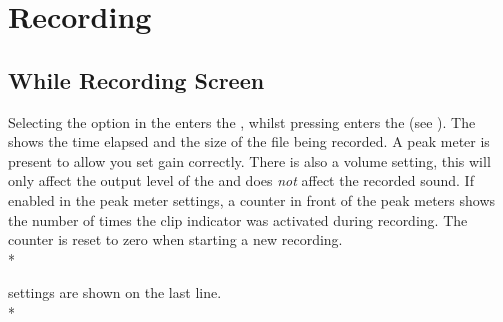 \section{\label{ref:Recording}Recording}
\subsection{\label{ref:while_recording_screen}While Recording Screen}

Selecting the  option in the  enters
the , whilst pressing \ActionStdContext{} enters the
 (see ). 
The 
shows the time elapsed and the size of the file being recorded. A peak meter
is present to allow you set gain correctly. There is also a volume setting,
this will only affect the output level of the \dap{} and does \emph{not}
affect the recorded sound. If enabled in the peak meter settings, a counter in
front of the peak meters shows the number of times the clip indicator was
activated during recording. The counter is reset to zero when starting a new
recording.\\*


 settings are shown on the last line.\\*

